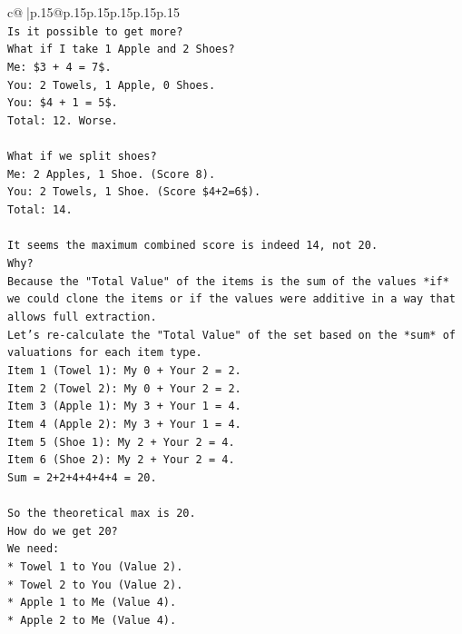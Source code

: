 \documentclass{article}
\begin{document}
{\begin{supertabular}{c@{$\;$}|p{.15\linewidth}@{}p{.15\linewidth}p{.15\linewidth}p{.15\linewidth}p{.15\linewidth}p{.15\linewidth}}
{{{\\ 
\texttt{Is it possible to get more?} \\
\texttt{What if I take 1 Apple and 2 Shoes?} \\
\texttt{Me: \$3 + 4 = 7\$.} \\
\texttt{You: 2 Towels, 1 Apple, 0 Shoes.} \\
\texttt{You: \$4 + 1 = 5\$.} \\
\texttt{Total: 12. Worse.} \\
\\ 
\texttt{What if we split shoes?} \\
\texttt{Me: 2 Apples, 1 Shoe. (Score 8).} \\
\texttt{You: 2 Towels, 1 Shoe. (Score \$4+2=6\$).} \\
\texttt{Total: 14.} \\
\\ 
\texttt{It seems the maximum combined score is indeed 14, not 20.} \\
\texttt{Why?} \\
\texttt{Because the "Total Value" of the items is the sum of the values *if* we could clone the items or if the values were additive in a way that allows full extraction.} \\
\texttt{Let's re{-}calculate the "Total Value" of the set based on the *sum* of valuations for each item type.} \\
\texttt{Item 1 (Towel 1): My 0 + Your 2 = 2.} \\
\texttt{Item 2 (Towel 2): My 0 + Your 2 = 2.} \\
\texttt{Item 3 (Apple 1): My 3 + Your 1 = 4.} \\
\texttt{Item 4 (Apple 2): My 3 + Your 1 = 4.} \\
\texttt{Item 5 (Shoe 1): My 2 + Your 2 = 4.} \\
\texttt{Item 6 (Shoe 2): My 2 + Your 2 = 4.} \\
\texttt{Sum = 2+2+4+4+4+4 = 20.} \\
\\ 
\texttt{So the theoretical max is 20.} \\
\texttt{How do we get 20?} \\
\texttt{We need:} \\
\texttt{*   Towel 1 to You (Value 2).} \\
\texttt{*   Towel 2 to You (Value 2).} \\
\texttt{*   Apple 1 to Me (Value 4).} \\
\texttt{*   Apple 2 to Me (Value 4).} \\
}}}
\end{supertabular}}
\end{document}
